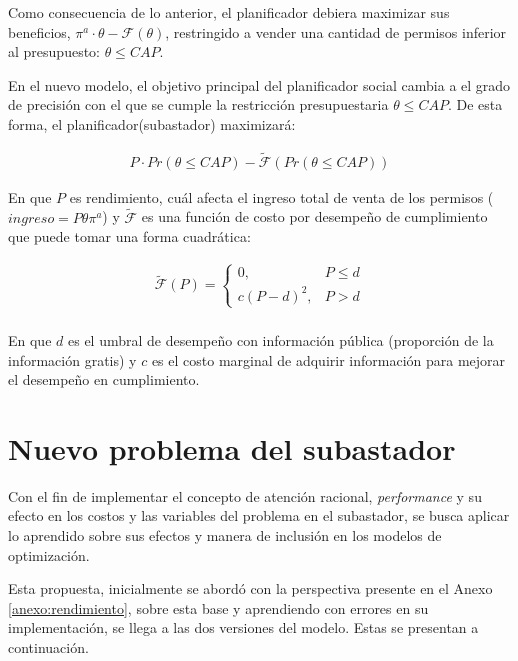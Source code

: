 Como consecuencia de lo anterior, el planificador debiera maximizar sus beneficios, $\pi^a\cdot\theta-\mathcal{F}(\theta)$, restringido a vender una cantidad de permisos inferior al presupuesto: $\theta\leq CAP$.
\vspace{2.5mm}


En el nuevo modelo, el objetivo principal del planificador social cambia a el grado de precisión con el que se cumple la restricción presupuestaria $\theta\leq CAP$. De esta forma, el planificador(subastador) maximizará:

\begin{align}
P\cdot Pr(\theta\leq CAP)-\tilde{\mathcal{F}}(Pr(\theta\leq CAP)) \label{nuevafposible}    
\end{align}


En que $P$ es rendimiento, cuál afecta el ingreso total de venta de los permisos ($ingreso = P\theta \pi^a$) y $\tilde{\mathcal{F}}$ es una función de costo por desempeño de cumplimiento que puede tomar una forma cuadrática:

\begin{equation}
\begin{array}{rrclcl}
    \tilde{\mathcal{F}}(P)=\begin{cases}0,&P\leq d\\c(P-d)^2,&P>d\end{cases}\label{costoperformace}\\
\end{array}
\end{equation}

En que $d$ es el umbral de desempeño con información pública (proporción de la información gratis) y $c$ es el costo marginal de adquirir información para mejorar el desempeño en cumplimiento.
\vspace{2.5mm}


\section{Nuevo problema del subastador}

 Con el fin de implementar el concepto de atención racional, \textit{performance} y su efecto en los costos y las variables del problema en el subastador, se busca aplicar lo aprendido sobre sus efectos y manera de inclusión en los modelos de optimización.
\vspace{2.5mm} 

Esta propuesta, inicialmente se abordó con la perspectiva presente en el Anexo \ref{anexo:rendimiento}, sobre esta base y aprendiendo con errores en su implementación, se llega a las dos versiones del modelo. Estas se presentan a continuación.

